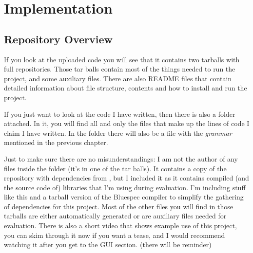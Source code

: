 \documentclass[12pt]{report}
\begin{document}
\chapter{Implementation}
\section{Repository Overview}
If you look at the uploaded code you will see that it contains two tarballs with full repositories.
Those tar balls contain most of the things needed to run the project, and some auxiliary files. There are also README files that contain detailed information about file structure, contents and how to install and run the project.
\par
If you just want to look at the code I have written, then there is also a  folder attached.
In it, you will find all and only the files that make up the lines of code I claim I have written. In the  folder there will also be a  file with the \emph{grammar} mentioned in the previous chapter.
\par
Just to make sure there are no misunderstandings: I am not the author of any files inside the  folder (it's in one of the tar balls). It contains a copy of the repository with dependencies from \cite{Flute core}, but I included it as it contains compiled (and the source code of) libraries that I'm using during evaluation. I'm including stuff like this and a tarball version of the Bluespec compiler to simplify the gathering of dependencies for this project.
Most of the other files you will find in those tarballs are either automatically generated or are auxiliary files needed for evaluation.
There is also a short video that shows example use of this project, you can skim through it now if you want a tease, and I would recommend watching it after you get to the GUI section. (there will be reminder)
\end{document}
